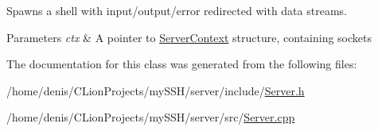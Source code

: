 Spawns a shell with input/output/error redirected with data streams. 


\begin{DoxyParams}{Parameters}
{\em ctx} & A pointer to \hyperlink{structServerContext}{Server\+Context} structure, containing sockets \\
\hline
\end{DoxyParams}


The documentation for this class was generated from the following files\+:\begin{DoxyCompactItemize}
\item 
/home/denis/\+C\+Lion\+Projects/my\+S\+S\+H/server/include/\hyperlink{Server_8h}{Server.\+h}\item 
/home/denis/\+C\+Lion\+Projects/my\+S\+S\+H/server/src/\hyperlink{Server_8cpp}{Server.\+cpp}\end{DoxyCompactItemize}
